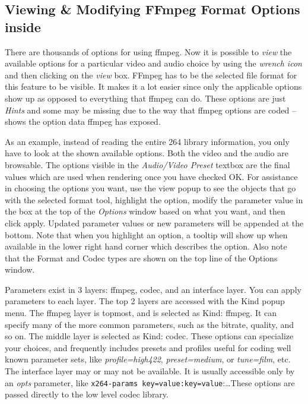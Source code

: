 \subsection{Viewing \& Modifying FFmpeg Format Options inside \CGG{}}%
\label{sub:viewing_modifying_ffmpeg_cinelerra}

There are thousands of options for using ffmpeg.  Now it is possible to \textit{view} the available options for a particular video and audio choice by using the \textit{wrench icon} and then clicking on the \textit{view} box.  FFmpeg has to be the selected file format for this feature to be visible.  It makes it a lot easier since only the applicable options show up as opposed to everything that ffmpeg can do.  These options are just \textit{Hints} and some may be missing due to the way that ffmpeg options are coded -- \CGG{} shows the option data ffmpeg has exposed.

As an example, instead of reading the entire 264 library
information, you only have to look at the shown available options.
Both the video and the audio are browsable. The options visible in
the \textit{Audio/Video Preset} textbox are the final values which
are used when rendering once you have checked OK\@.  For assistance
in choosing the options you want, use the view popup to see the
objects that go with the selected format tool, highlight the option,
modify the parameter value in the box at the top of the
\textit{Options} window based on what you want, and then click
apply.  Updated parameter values or new parameters will be appended
at the bottom.  Note that when you highlight an option, a tooltip
will show up when available in the lower right hand corner which
describes the option.  Also note that the Format and Codec types are
shown on the top line of the Options window.

Parameters exist in 3 layers: ffmpeg, codec, and an interface layer.  You can apply parameters to each layer.  The top 2 layers are accessed with the Kind popup menu. The ffmpeg layer is topmost, and is selected as Kind: ffmpeg.  It can specify many of the more common parameters, such as the bitrate, quality, and so on.  The middle layer is selected as Kind: codec.  These options can specialize your choices, and frequently includes presets and profiles useful for coding well known parameter sets, like \textit{profile=high422}, \textit{preset=medium}, or \textit{tune=film}, etc.   The interface layer may or may not be available.  It is usually accessible only by an \textit{opts} parameter, like \texttt{x264-params key=value:key=value}:\dots  These options are passed directly to the low level codec library.

